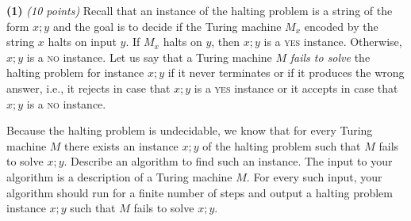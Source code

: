 \documentclass[11pt]{article}
\def\bigap{0.25in}
\begin{document}
\setlength{\parindent}{0in}
\addtolength{\parskip}{0.1cm}
\setlength{\fboxrule}{.5mm}\setlength{\fboxsep}{1.2mm}
\newlength{\boxlength}\setlength{\boxlength}{\textwidth}
\addtolength{\boxlength}{-4mm}
\begin{center}
\end{center}
\vspace{5mm}

{ \bf (1)} {\em (10 points)}
Recall that
an instance of the halting problem is a string of the form 
$x;y$ and the goal is to decide if the Turing machine $M_x$ 
encoded by the string $x$ halts on input $y$.
If $M_x$ halts on $y$, then $x; y$ is a \textsc{yes} instance.
Otherwise, $x; y$ is a \textsc{no} instance. Let us say that 
a Turing machine $M$ \emph{fails to solve} the halting 
problem for instance $x;y$ if it 
never terminates or if it produces the wrong answer, 
i.e., it rejects in case that $x;y$ is a \textsc{yes} instance 
or it accepts in case that $x;y$ is a \textsc{no} instance.

Because the halting problem is undecidable, we know
that for every Turing machine $M$ there exists an 
instance $x;y$ of the halting problem such that $M$
fails to solve $x;y$. Describe an algorithm to find 
such an instance. The input to your algorithm is a
description of a Turing machine $M$. For every such
input, your algorithm should run for a finite number
of steps and output
a halting problem instance $x;y$ such that 
$M$ fails to solve $x;y$. 


\vskip \bigap

\end{document}
